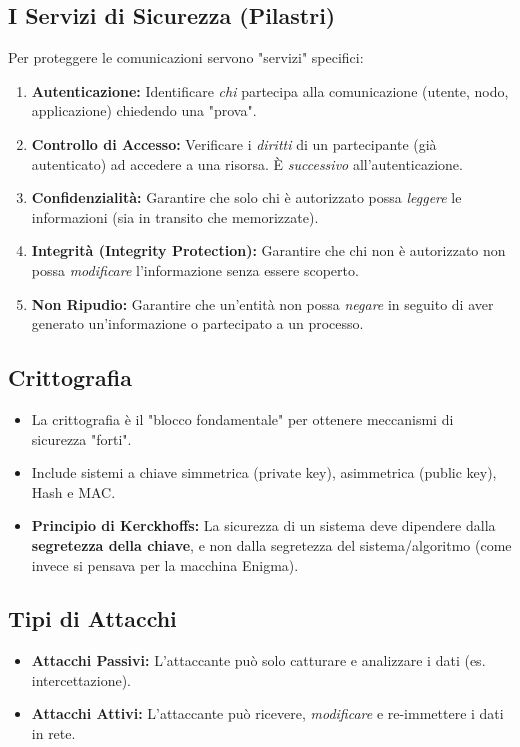 \documentclass[a4paper,12pt]{article}
\begin{document}
\subsection{I Servizi di Sicurezza (Pilastri)}
Per proteggere le comunicazioni servono "servizi" specifici:
\begin{enumerate}
    \item \textbf{Autenticazione:} Identificare \emph{chi} partecipa alla comunicazione (utente, nodo, applicazione) chiedendo una "prova".
    \item \textbf{Controllo di Accesso:} Verificare i \emph{diritti} di un partecipante (già autenticato) ad accedere a una risorsa. È \emph{successivo} all'autenticazione.
    \item \textbf{Confidenzialità:} Garantire che solo chi è autorizzato possa \emph{leggere} le informazioni (sia in transito che memorizzate).
    \item \textbf{Integrità (Integrity Protection):} Garantire che chi non è autorizzato non possa \emph{modificare} l'informazione senza essere scoperto.
    \item \textbf{Non Ripudio:} Garantire che un'entità non possa \emph{negare} in seguito di aver generato un'informazione o partecipato a un processo.
\end{enumerate}

\subsection{Crittografia}
\begin{itemize}
    \item La crittografia è il "blocco fondamentale" per ottenere meccanismi di sicurezza "forti".
    \item Include sistemi a chiave simmetrica (private key), asimmetrica (public key), Hash e MAC.
    \item \textbf{Principio di Kerckhoffs:} La sicurezza di un sistema deve dipendere dalla \textbf{segretezza della chiave}, e non dalla segretezza del sistema/algoritmo (come invece si pensava per la macchina Enigma).
\end{itemize}

\subsection{Tipi di Attacchi}
\begin{itemize}
    \item \textbf{Attacchi Passivi:} L'attaccante può solo catturare e analizzare i dati (es. intercettazione).
    \item \textbf{Attacchi Attivi:} L'attaccante può ricevere, \emph{modificare} e re-immettere i dati in rete.
\end{itemize}
\end{document}
